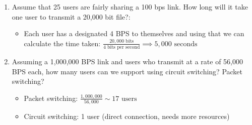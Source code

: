 \documentclass{article}
\begin{document}
\begin{enumerate}
\item Assume that 25 users are fairly sharing a 100 bps link. How long will it take one user to transmit a 20,000 bit file?:
\begin{itemize}
\item Each user has a designated 4 BPS to themselves and using that we can calculate the time taken: $\frac{20,000 \text{ bits}}{4 \text{ bits per second}} \implies 5,000 \text{ seconds }$
\end{itemize}

\item Assuming a 1,000,000 BPS link and users who transmit at a rate of 56,000 BPS each, how many users can we support using circuit switching? Packet switching?
\begin{itemize}
\item Packet switching: $\frac{1,000,000}{56,000} \sim 17 \text{ users}$
\item Circuit switching: 1 user (direct connection, needs more resources)
\end{itemize}

\end{enumerate}
\end{document}
